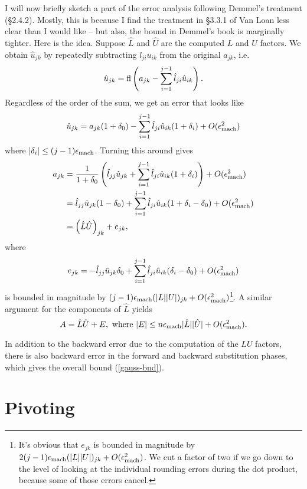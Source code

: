 \documentclass[12pt, leqno]{article} %
\begin{document}
I will now briefly sketch a part of the error analysis following
Demmel's treatment (\S 2.4.2).  Mostly, this is because I find the
treatment in \S 3.3.1 of Van Loan less clear than I would like -- but
also, the bound in Demmel's book is marginally tighter.  Here is the
idea.  Suppose $\hat{L}$ and $\hat{U}$ are the computed $L$ and $U$
factors.  We obtain $\hat{u}_{jk}$ by repeatedly subtracting $l_{ji}
u_{ik}$ from the original $a_{jk}$, i.e.
\[
  \hat{u}_{jk} =
    \operatorname{fl}\left( a_{jk} - \sum_{i=1}^{j-1} \hat{l}_{ji} \hat{u}_{ik} \right).
\]
Regardless of the order of the sum, we get an error that looks like
\[
  \hat{u}_{jk} = a_{jk}(1+\delta_0) -
                 \sum_{i=1}^{j-1} \hat{l}_{ji} \hat{u}_{ik} (1+\delta_i) +
                 O(\epsilon_{\mathrm{mach}}^2)
\]
where $|\delta_i| \leq (j-1) \epsilon_{\mathrm{mach}}$.  Turning this around gives
\begin{align*}
  a_{jk} & =
  \frac{1}{1+\delta_0} \left(
    \hat{l}_{jj} \hat{u}_{jk} +
    \sum_{i=1}^{j-1} \hat{l}_{ji} \hat{u}_{ik} (1 + \delta_i)
  \right) + O(\epsilon_{\mathrm{mach}}^2) \\
  & =
    \hat{l}_{jj} \hat{u}_{jk} (1 - \delta_0) +
    \sum_{i=1}^{j-1} \hat{l}_{ji} \hat{u}_{ik} (1 + \delta_i - \delta_0) +
    O(\epsilon_{\mathrm{mach}}^2) \\
  & =
    \left( \hat{L} \hat{U} \right)_{jk} + e_{jk},
\end{align*}
where
\[
   e_{jk} =
    -\hat{l}_{jj} \hat{u}_{jk} \delta_0 +
    \sum_{i=1}^{j-1} \hat{l}_{ji} \hat{u}_{ik} (\delta_i - \delta_0) +
    O(\epsilon_{\mathrm{mach}}^2)
\]
is bounded in magnitude by $(j-1) \epsilon_{\mathrm{mach}} (|L||U|)_{jk} + O(\epsilon_{\mathrm{mach}}^2)$\footnote{
  It's obvious that $e_{jk}$ is bounded in magnitude by $2(j-1)
  \epsilon_{\mathrm{mach}}(|L||U|)_{jk} + O(\epsilon_{\mathrm{mach}}^2)$.  We cut a factor of two if
  we go down to the level of looking at the individual rounding errors
  during the dot product, because some of those errors cancel.
}.
A similar argument for the components of $\hat{L}$ yields
\[
  A = \hat{L} \hat{U} + E, \mbox{ where }
  |E| \leq n \epsilon_{\mathrm{mach}} |\hat{L}| |\hat{U}| + O(\epsilon_{\mathrm{mach}}^2).
\]

In addition to the backward error due to the computation of the $LU$
factors, there is also backward error in the forward and backward
substitution phases, which gives the overall bound (\ref{gauss-bnd}).
\section{Pivoting}
\end{document}
